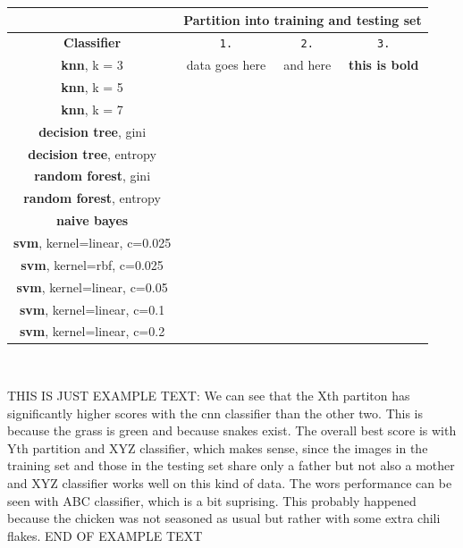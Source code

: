 \documentclass[12pt,a4paper]{article}
\begin{document}
    \begin{center}
        \begin{tabular}{|c|c|c|c|}
            \hline
			 & \multicolumn{3}{c|}{\textbf{Partition into training and testing set}} \\
			\hline 
			\textbf{Classifier} & \texttt{1.} & \texttt{2.} & \texttt{3.} \\
            \hline \hline
            
			\textbf{knn}, \small k = 3 & data goes here & and here & \textbf{this is bold} \\
			\textbf{knn}, \small k = 5 &  &  &  \\
			\textbf{knn}, \small k = 7 &  &  &  \\
			\hline \hline
			\textbf{decision tree}, \small gini &  &  &  \\
			\textbf{decision tree}, \small entropy &  &  &  \\
			\hline \hline
			\textbf{random forest}, \small gini &  &  &  \\
			\textbf{random forest}, \small entropy &  &  &  \\
			\hline \hline
			\textbf{naive bayes} &  &  &  \\
			\hline \hline
			\textbf{svm}, \small kernel=linear, c=0.025 &  &  &  \\
			\textbf{svm}, \small kernel=rbf, c=0.025 &  &  &  \\
			\textbf{svm}, \small kernel=linear, c=0.05 &  &  &  \\
			\textbf{svm}, \small kernel=linear, c=0.1 &  &  &  \\
			\textbf{svm}, \small kernel=linear, c=0.2 &  &  &  \\
			\hline
		\end{tabular} \\
    \end{center}
    
     THIS IS JUST EXAMPLE TEXT: We can see that the Xth partiton has significantly higher scores with the cnn classifier than the other two. This is because the grass is green and because snakes exist. The overall best score is with Yth partition and XYZ classifier, which makes sense, since the images in the training set and those in the testing set share only a father but not also a mother and XYZ classifier works well on this kind of data. The wors performance can be seen with ABC classifier, which is a bit suprising. This probably happened because the chicken was not seasoned as usual but rather with some extra chili flakes. END OF EXAMPLE TEXT
\end{document}
